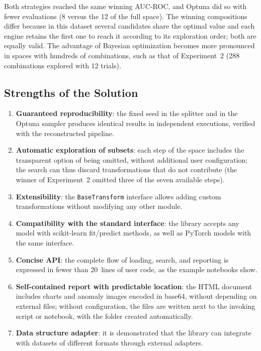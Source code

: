 \documentclass[conference]{IEEEtran}
\begin{document}
Both strategies reached the same winning AUC-ROC, and Optuna did so with fewer
evaluations (8 versus the 12 of the full space). The winning compositions
differ because in this dataset several candidates share the optimal value and
each engine retains the first one to reach it according to its exploration
order; both are equally valid. The advantage of Bayesian optimization becomes
more pronounced in spaces with hundreds of combinations, such as that of
Experiment~2 (288 combinations explored with 12 trials).

\subsection{Strengths of the Solution}

\begin{enumerate}
\item \textbf{Guaranteed reproducibility}: the fixed seed in the splitter and
  in the Optuna sampler produces identical results in independent executions,
  verified with the reconstructed pipeline.
\item \textbf{Automatic exploration of subsets}: each step of the space
  includes the transparent option of being omitted, without additional user
  configuration; the search can thus discard transformations that do not
  contribute (the winner of Experiment~2 omitted three of the seven available
  steps).
\item \textbf{Extensibility}: the \texttt{BaseTransform} interface allows
  adding custom transformations without modifying any other module.
\item \textbf{Compatibility with the standard interface}: the library accepts
  any model with scikit-learn fit/predict methods, as well as PyTorch models
  with the same interface.
\item \textbf{Concise API}: the complete flow of loading, search, and
  reporting is expressed in fewer than 20~lines of user code, as the example
  notebooks show.
\item \textbf{Self-contained report with predictable location}: the HTML
  document includes charts and anomaly images encoded in base64, without
  depending on external files; without configuration, the files are written
  next to the invoking script or notebook, with the folder created
  automatically.
\item \textbf{Data structure adapter}: it is demonstrated that the library can
  integrate with datasets of different formats through external adapters.
\end{enumerate}
\end{document}
